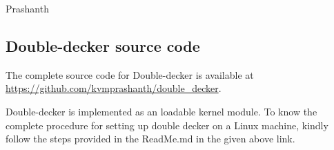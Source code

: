 \documentclass[11pt,a4paper]{report}
\newcommand{\dd}{Double-decker}
\begin{document}
    \vspace*{2em}
    \noindent Prashanth
    
    
  \tableofcontents
  \listoftables
  \listoffigures
  \cleardoublepage
  \setcounter{page}{1}
  \setlength{\parskip}{1em}
  
    
   
  
  
  
  
  
  
  
    
  
  \appendix
  \begin{appendices}
    \chapter{\dd{} source code}
      The complete source code for \dd{} is available at \url{https://github.com/kvmprashanth/double_decker}.
      
      \dd{} is implemented as an loadable kernel module. To know the complete procedure for setting up double decker on
      a Linux machine, kindly follow the steps provided in the ReadMe.md in the given above link.
    
  \end{appendices}
\end{document}
